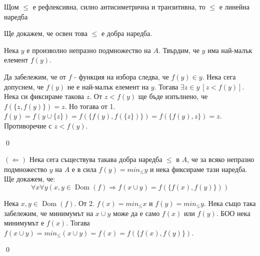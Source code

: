 \quad
Щом $\leq$ е рефлексивна, силно антисиметрична и транзитивна, то $\leq$ е линейна наредба

\quad
Ще докажем, че освен това $\leq$ е добра наредба.

\quad
Нека $y$ е произволно непразно подмножество на $A$. Твърдим, че $y$ има най-малък елемент $f(y)$.

\begin{tcolorbox}[mybox, title={Доказателство:}]
\quad
Да забележим, че от $f$ - функция на избора следва, че $f(y) \in y$.
Нека сега допуснем, че $f(y)$ не е най-малък елемент на $y$. Тогава
$\exists z \in y\ [z < f(y)]$.
Нека си фиксираме такова $z$.
От $z < f(y)$ ще бъде изпълнено, че $f(\{z, f(y)\}) = z$.
Но тогава от 1.
$f(y) = f(y \cup \{z\}) = f(\{f(y), f(\{z\})\}) = f(\{f(y), z\}) = z$.
Противоречие с $z < f(y)$.

\qed
\end{tcolorbox}

\bigbreak
\quad
$(\Leftarrow)$
Нека сега съществува такава добра наредба $\leq$ в $A$, че за всяко непразно подмножество $y$ на $A$ е в сила $f(y) = min_{\leq} y$
и нека фиксираме тази наредба.
Ще докажем, че:
\[
\forall x \forall y (x, y \in \operatorname{Dom}(f) \Rightarrow f(x \cup y) = f(\{ f(x), f(y) \}) )
\]

\begin{tcolorbox}[mybox, title={Доказателство:}]
\quad
Нека $x, y \in \operatorname{Dom}(f)$.
От 2. $f(x) = min_{\leq} x$ и $f(y) = min_{\leq} y$.
Нека също така забележим, че минимумът на $x \cup y$ може да е само $f(x)$ или $f(y)$.
БОО нека минимумът е $f(x)$.
Тогава $f(x \cup y) = min_{\leq} (x \cup y) = f(x) = f(\{f(x), f(y)\})$.

\qed
\end{tcolorbox}
